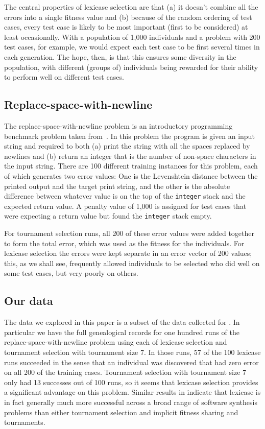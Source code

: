 The central properties of lexicase selection are that (a) it doesn't combine all the errors into a single
fitness value and (b) because of the random ordering of test cases, every test case is likely to be
most important (first to be considered) at least occasionally. With a population of 1,000 individuals
and a problem with 200 test cases, for example, we would expect each test case to be first several
times in each generation. The hope, then, is that this ensures some diversity in the population, with
different (groups of) individuals being rewarded for their ability to perform well on different test
cases.

\subsection{Replace-space-with-newline}

The replace-space-with-newline problem is an introductory programming benchmark problem taken
from~\citep{Helmuth:2015:GECCO}. In this problem the program is given an input string and required to
both (a) print the string with all the spaces replaced by newlines and (b) return an integer that
is the number of non-space characters in the input string. There are 100 different training instances 
for this problem, each of which generates two error values: One is the Levenshtein distance between
the printed output and the target print string, and the other is the absolute difference between
whatever value is on the top of the \texttt{integer} stack and the expected return value. A penalty
value of 1,000 is assigned for test cases that were expecting a return value but found the
\texttt{integer} stack empty.

For tournament selection runs, all 200 of these error values were added together to form the
total error, which was used as the fitness for the individuals. For lexicase selection the errors
were kept separate in an error vector of 200 values; this, as we shall see, frequently allowed individuals to be selected who did 
well on some test cases, but very poorly on others.

\subsection{Our data}
\label{sec:ourData}

The data we explored in this paper is a subset of the data collected for \citep{Helmuth:2015:GPTP}. In particular
we have the full genealogical records for one hundred runs of the replace-space-with-newline problem using each 
of lexicase selection and tournament
selection with tournament size 7. In those
runs, 57 of the 100 lexicase runs succeeded in the sense that an individual was discovered that had zero
error on all 200 of the training cases. Tournament selection with tournament size 7 only
had 13 successes out of 100 runs, so it seems that
lexicase selection provides a significant advantage on this problem. Similar results in \citep{Helmuth:2015:GECCO}
indicate that lexicase is in fact generally much more successful across a broad range of
software synthesis problems than either tournament selection and implicit fitness
sharing and tournaments.

